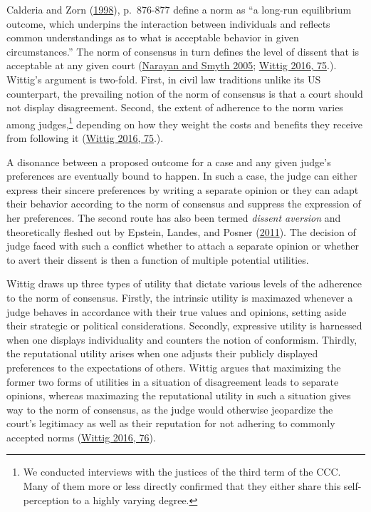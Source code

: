 \documentclass[
  11pt,
]{article}
\begin{document}
Calderia and Zorn
(\protect\hyperlink{ref-calderiaTimeConsensualNorms1998}{1998}),
p.~876-877 define a norm as ``a long-run equilibrium outcome, which
underpins the interaction between individuals and reflects common
understandings as to what is acceptable behavior in given
circumstances.'' The norm of consensus in turn defines the level of
dissent that is acceptable at any given court
(\protect\hyperlink{ref-narayanConsensualNormHigh2005}{Narayan and Smyth
2005};
\protect\hyperlink{ref-wittigOccurrenceSeparateOpinions2016}{Wittig
2016, 75}.). Wittig's argument is two-fold. First, in civil law
traditions unlike its US counterpart, the prevailing notion of the norm
of consensus is that a court should not display disagreement. Second,
the extent of adherence to the norm varies among judges,\footnote{We
  conducted interviews with the justices of the third term of the CCC.
  Many of them more or less directly confirmed that they either share
  this self-perception to a highly varying degree.} depending on how
they weight the costs and benefits they receive from following it
(\protect\hyperlink{ref-wittigOccurrenceSeparateOpinions2016}{Wittig
2016, 75}.).

A disonance between a proposed outcome for a case and any given judge's
preferences are eventually bound to happen. In such a case, the judge
can either express their sincere preferences by writing a separate
opinion or they can adapt their behavior according to the norm of
consensus and suppress the expression of her preferences. The second
route has also been termed \emph{dissent aversion} and theoretically
fleshed out by Epstein, Landes, and Posner
(\protect\hyperlink{ref-epsteinWhyWhenJudges2011}{2011}). The decision
of judge faced with such a conflict whether to attach a separate opinion
or whether to avert their dissent is then a function of multiple
potential utilities.

Wittig draws up three types of utility that dictate various levels of
the adherence to the norm of consensus. Firstly, the intrinsic utility
is maximazed whenever a judge behaves in accordance with their true
values and opinions, setting aside their strategic or political
considerations. Secondly, expressive utility is harnessed when one
displays individuality and counters the notion of conformism. Thirdly,
the reputational utility arises when one adjusts their publicly
displayed preferences to the expectations of others. Wittig argues that
maximizing the former two forms of utilities in a situation of
disagreement leads to separate opinions, whereas maximazing the
reputational utility in such a situation gives way to the norm of
consensus, as the judge would otherwise jeopardize the court's
legitimacy as well as their reputation for not adhering to commonly
accepted norms
(\protect\hyperlink{ref-wittigOccurrenceSeparateOpinions2016}{Wittig
2016, 76}).
\end{document}
